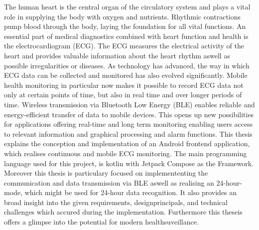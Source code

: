 \onehalfspacing
 {\Large The human heart is the central organ of the circulatory system and plays a vital role in supplying the body with oxygen and nutrients. Rhythmic contractions pump blood through the body, laying the foundation for all vital functions. An essential part of medical diagnostics combined with heart function and health is the electrocardiogram (ECG). The ECG measures the electrical activity of the heart and provides valuable information about the heart rhythm aswell as possible irregularities or diseases. As technology has advanced, the way in which ECG data can be collected and monitored has also evolved significantly. Mobile health monitoring in particular now makes it possible to record ECG data not only at certain points of time, but also in real time and over longer periods of time. Wireless transmission via Bluetooth Low Energy (BLE) enables reliable and energy-efficient transfer of data to mobile devices. This opens up new possibilities for applications offering real-time and long term monitoring enabling users access to relevant information and graphical processing and alarm functions. This thesis explains the conception and implementation of an Android frontend application, which realises continuous and mobile ECG monitoring. The main programming language used for this project, is kotlin with Jetpack Compose as the Framework.
	Moreover this thesis is particulary focused on implemententing  the communication and data transmission via BLE aswell as realising an 24-hour-mode, which might be used for 24-hour data recognition. It also provides an broad insight into the given requirements, designprincipals, and technical challenges which accured during the implementation. Furthermore this theseis offers a glimpse into the potential for modern healthsuveillance.\par }

